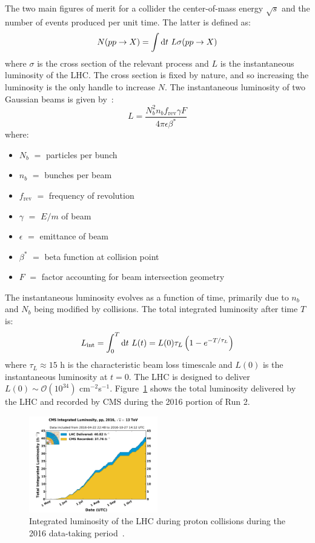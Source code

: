 The two main figures of merit for a collider the center-of-mass energy $\sqrt{s}$ and the number of events produced per unit time.
The latter is defined as:
\begin{equation} 
    N(pp\rightarrow X) = \int \mathrm{d} t~ L \sigma(pp\rightarrow X)
\end{equation}
where $\sigma$ is the cross section of the relevant process and $L$ is the instantaneous luminosity of the LHC. 
The cross section is fixed by nature, and so increasing the luminosity is the only handle to increase $N$. 
The instantaneous luminosity of two Gaussian beams is given by~\cite{lhcjinst}:
\begin{equation}
    L = \frac{N_b^2 n_b f_\mathrm{rev} \gamma F}{4\pi\epsilon \beta^*}
\end{equation}
where:
\begin{itemize}
    \setlength\itemsep{1pt}
    \item $N_b$ $=$ particles per bunch
    \item $n_b$ $=$ bunches per beam 
    \item $f_\mathrm{rev}$ $=$ frequency of revolution 
    \item $\gamma$ $=$ $E/m$ of beam 
    \item $\epsilon$ $=$ emittance of beam 
    \item $\beta^*$ $=$ beta function at collision point 
    \item $F$ $=$ factor accounting for beam intersection geometry
\end{itemize}
The instantaneous luminosity evolves as a function of time, primarily due to $n_b$ and $N_b$ being modified by collisions.
The total integrated luminosity after time $T$ is:
\begin{equation}
    L_\mathrm{int} = \int_0^T \mathrm{d} t~ L(t) = L(0) \tau_L \left(1 - e^{-T/\tau_L}\right)
\end{equation}
where $\tau_L \approx 15$ h is the characteristic beam loss timescale and $L(0)$ is the instantaneous luminosity at $t=0$.
The LHC is designed to deliver $L(0) \sim \mathcal{O}(10^{34})$ cm$^{-2}$s$^{-1}$. 
Figure~\ref{fig:cms:lumi} shows the total luminosity delivered by the LHC and recorded by CMS during the 2016 portion of Run 2. 

\begin{figure}[]
    \begin{center}
        \includegraphics[width=0.5\textwidth]{figures/cms/lumi.pdf}
        \caption{Integrated luminosity of the LHC during proton collisions during the 2016 data-taking period~\cite{lumitwiki}.}
        \label{fig:cms:lumi}
    \end{center}
\end{figure}

